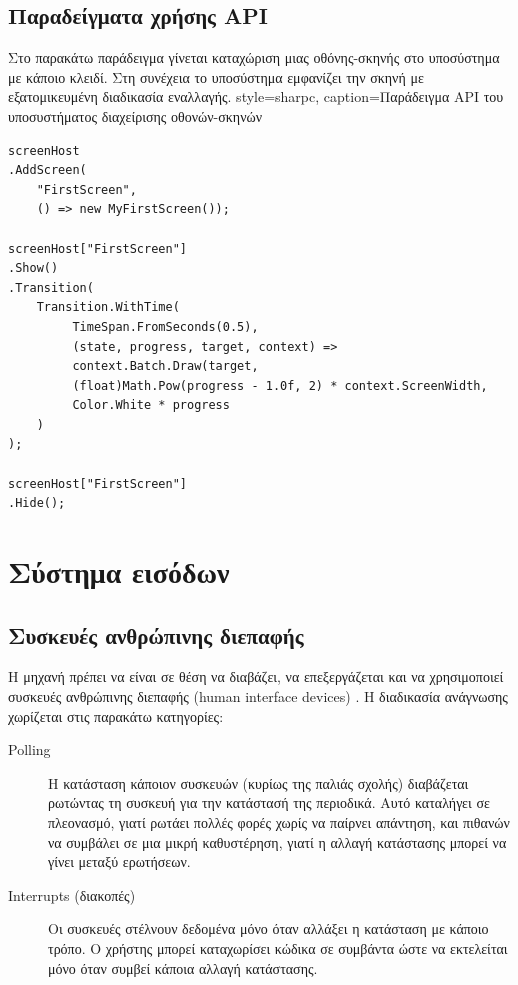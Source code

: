 	\subsection{Παραδείγματα χρήσης API}

Στο παρακάτω παράδειγμα γίνεται καταχώριση μιας οθόνης-σκηνής στο υποσύστημα με κάποιο κλειδί. Στη συνέχεια το υποσύστημα εμφανίζει την σκηνή με εξατομικευμένη διαδικασία εναλλαγής.
	\lstset
	{
		style=sharpc, 
		caption={Παράδειγμα API του υποσυστήματος διαχείρισης οθονών-σκηνών}
	}
	\begin{lstlisting}
screenHost
.AddScreen(
	"FirstScreen",
	() => new MyFirstScreen());
		
screenHost["FirstScreen"]
.Show()
.Transition(
	Transition.WithTime(
         TimeSpan.FromSeconds(0.5),
         (state, progress, target, context) =>
         context.Batch.Draw(target, 
         (float)Math.Pow(progress - 1.0f, 2) * context.ScreenWidth, 
         Color.White * progress
    )
);
     
screenHost["FirstScreen"]
.Hide();   
	\end{lstlisting}
	
	\section{Σύστημα εισόδων}
	\subsection{Συσκευές ανθρώπινης διεπαφής}
	Η μηχανή πρέπει να είναι σε θέση να διαβάζει, να επεξεργάζεται και να χρησιμοποιεί συσκευές ανθρώπινης διεπαφής (human interface devices) \cite{gregory2009game}. Η διαδικασία ανάγνωσης χωρίζεται στις παρακάτω κατηγορίες:
	\begin{description}
	\item [Polling] Η κατάσταση κάποιον συσκευών (κυρίως της παλιάς σχολής) διαβάζεται ρωτώντας τη συσκευή για την κατάστασή της περιοδικά. Αυτό καταλήγει σε πλεονασμό, γιατί ρωτάει πολλές φορές χωρίς να παίρνει απάντηση, και πιθανών να συμβάλει σε μια μικρή καθυστέρηση, γιατί η αλλαγή κατάστασης μπορεί να γίνει μεταξύ ερωτήσεων.
	\item [Ιnterrupts (διακοπές)] Οι συσκευές στέλνουν δεδομένα μόνο όταν αλλάξει η κατάσταση με κάποιο τρόπο. Ο χρήστης μπορεί καταχωρίσει κώδικα σε συμβάντα ώστε να εκτελείται μόνο όταν συμβεί κάποια αλλαγή κατάστασης.
	\end{description}
	
